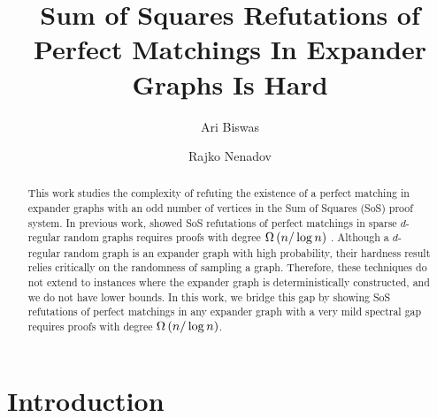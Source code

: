 \documentclass[11pt]{article}
\title{Sum of Squares Refutations of Perfect Matchings In Expander Graphs Is Hard}
\author[1]{Ari Biswas}
\author[2]{Rajko Nenadov}
\affil[1]{\small University Of Warwick, United Kingdom}
\affil[2]{\small University Of Auckland, New Zealand}
\date{}
\begin{document}
\maketitle
\begin{abstract}
This work studies the complexity of refuting the existence of a perfect matching in expander graphs with an odd number of vertices in the Sum of Squares (SoS) proof system.
In previous work, \citet{Austrin_2022} showed  SoS refutations of perfect matchings in sparse $d$-regular random graphs requires proofs with degree $\Omega\left(n/\log n\right)$ .
Although a $d$-regular random graph is an expander graph with high probability, their hardness result relies critically on the randomness of sampling a graph.
Therefore, these techniques do not extend to instances where the expander graph is deterministically constructed, and we do not have   lower bounds.
In this work, we bridge this gap by showing SoS refutations of perfect matchings in any expander graph with a very mild spectral gap requires proofs with degree $\Omega\left(n/\log n\right)$.

\end{abstract}

\section{Introduction}
\end{document}
